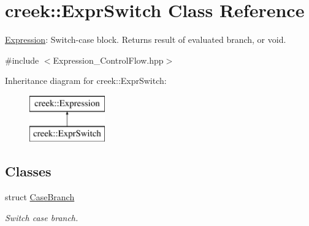 \hypertarget{classcreek_1_1_expr_switch}{}\section{creek\+:\+:Expr\+Switch Class Reference}
\label{classcreek_1_1_expr_switch}


\hyperlink{classcreek_1_1_expression}{Expression}\+: Switch-\/case block. Returns result of evaluated branch, or void.  




{\ttfamily \#include $<$Expression\+\_\+\+Control\+Flow.\+hpp$>$}

Inheritance diagram for creek\+:\+:Expr\+Switch\+:\begin{figure}[H]
\begin{center}
\leavevmode
\includegraphics[height=2.000000cm]{classcreek_1_1_expr_switch}
\end{center}
\end{figure}
\subsection*{Classes}
\begin{DoxyCompactItemize}
\item 
struct \hyperlink{structcreek_1_1_expr_switch_1_1_case_branch}{Case\+Branch}
\begin{DoxyCompactList}\small\item\em Switch case branch. \end{DoxyCompactList}\end{DoxyCompactItemize}
